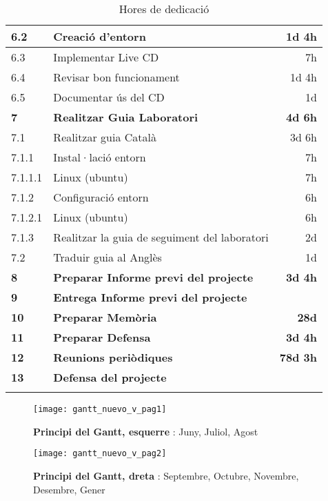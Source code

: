 \begin{center}
\begin{longtable}{ l | p{10cm} | r }
\hline
6.2 & Creació d'entorn & 1d 4h\\
\hline
6.3 & Implementar Live CD & 7h\\
\hline
6.4 & Revisar bon funcionament & 1d 4h\\
\hline
6.5 & Documentar ús del CD & 1d\\
\hline \hline
	\textbf{7} & 	\textbf{Realitzar Guia Laboratori } & 	\textbf{4d 6h}\\
\hline
7.1 & Realitzar guia Català & 3d 6h\\
\hline
7.1.1 & Instal·lació entorn & 7h\\
\hline
7.1.1.1 & Linux (ubuntu) & 7h\\
\hline
7.1.2 & Configuració entorn & 6h\\
\hline
7.1.2.1 & Linux (ubuntu) & 6h\\
\hline
7.1.3 & Realitzar la guia de seguiment del laboratori & 2d\\
\hline
7.2 & Traduir guia al Anglès & 1d\\
\hline \hline
	\textbf{8} & 	\textbf{Preparar Informe previ del projecte } & 	\textbf{3d 4h}\\
\hline \hline
\textbf{9} & \textbf{Entrega Informe previ del projecte} & \\
\hline \hline
	\textbf{10} & 	\textbf{Preparar Memòria } & 	\textbf{28d}\\
\hline \hline
	\textbf{11} & 	\textbf{Preparar Defensa } & 	\textbf{3d 4h}\\
\hline \hline
	\textbf{12} & 	\textbf{Reunions periòdiques } & 	\textbf{78d 3h}\\
\hline \hline
\textbf{13} & \textbf{Defensa del projecte} & \\
\hline
		
	\caption{Hores de dedicació}
	\label{tab:int:plan:hores}
	\end{longtable}

\end{center}

\begin{figure}[p]%
	\begin{leftfullpage}
		\texttt{[image: gantt\_nuevo\_v\_pag1]}
	\end{leftfullpage}
	\caption[Principi del Gantt, esquerre]{\textbf{Principi del Gantt, esquerre} : Juny, Juliol, Agost}
	\label{gantt_nuevo_v_pag1}
\end{figure}
\begin{figure}[p]%
	\begin{fullpage}
		\texttt{[image: gantt\_nuevo\_v\_pag2]}
	\end{fullpage}
	\caption[Principi del Gantt, dreta]{\textbf{Principi del Gantt, dreta} : Septembre, Octubre, Novembre, Desembre, Gener}
	\label{gantt_nuevo_v_pag2}
\end{figure}

